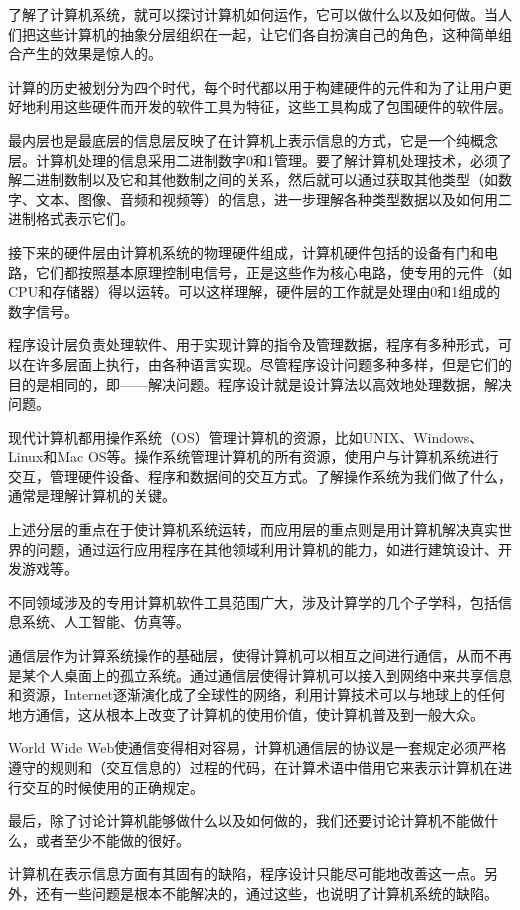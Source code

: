 了解了计算机系统，就可以探讨计算机如何运作，它可以做什么以及如何做。当人们把这些计算机的抽象分层组织在一起，让它们各自扮演自己的角色，这种简单组合产生的效果是惊人的。

计算的历史被划分为四个时代，每个时代都以用于构建硬件的元件和为了让用户更好地利用这些硬件而开发的软件工具为特征，这些工具构成了包围硬件的软件层。

最内层也是最底层的信息层反映了在计算机上表示信息的方式，它是一个纯概念层。计算机处理的信息采用二进制数字0和1管理。要了解计算机处理技术，必须了解二进制数制以及它和其他数制之间的关系，然后就可以通过获取其他类型（如数字、文本、图像、音频和视频等）的信息，进一步理解各种类型数据以及如何用二进制格式表示它们。

接下来的硬件层由计算机系统的物理硬件组成，计算机硬件包括的设备有门和电路，它们都按照基本原理控制电信号，正是这些作为核心电路，使专用的元件（如CPU和存储器）得以运转。可以这样理解，硬件层的工作就是处理由0和1组成的数字信号。

程序设计层负责处理软件、用于实现计算的指令及管理数据，程序有多种形式，可以在许多层面上执行，由各种语言实现。尽管程序设计问题多种多样，但是它们的目的是相同的，即——解决问题。程序设计就是设计算法以高效地处理数据，解决问题。

现代计算机都用操作系统（OS）管理计算机的资源，比如UNIX、Windows、Linux和Mac OS等。操作系统管理计算机的所有资源，使用户与计算机系统进行交互，管理硬件设备、程序和数据间的交互方式。了解操作系统为我们做了什么，通常是理解计算机的关键。

上述分层的重点在于使计算机系统运转，而应用层的重点则是用计算机解决真实世界的问题，通过运行应用程序在其他领域利用计算机的能力，如进行建筑设计、开发游戏等。

不同领域涉及的专用计算机软件工具范围广大，涉及计算学的几个子学科，包括信息系统、人工智能、仿真等。

通信层作为计算系统操作的基础层，使得计算机可以相互之间进行通信，从而不再是某个人桌面上的孤立系统。通过通信层使得计算机可以接入到网络中来共享信息和资源，Internet逐渐演化成了全球性的网络，利用计算技术可以与地球上的任何地方通信，这从根本上改变了计算机的使用价值，使计算机普及到一般大众。

World Wide Web使通信变得相对容易，计算机通信层的协议是一套规定必须严格遵守的规则和（交互信息的）过程的代码，在计算术语中借用它来表示计算机在进行交互的时候使用的正确规定。

最后，除了讨论计算机能够做什么以及如何做的，我们还要讨论计算机不能做什么，或者至少不能做的很好。

计算机在表示信息方面有其固有的缺陷，程序设计只能尽可能地改善这一点。另外，还有一些问题是根本不能解决的，通过这些，也说明了计算机系统的缺陷。

